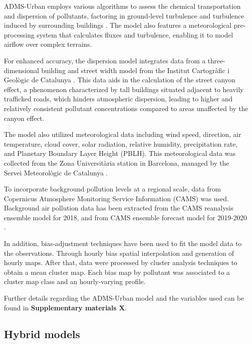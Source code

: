 \documentclass{article}
\begin{document}
ADMS-Urban employs various algorithms to assess the chemical transportation and dispersion of pollutants, factoring in ground-level turbulence and turbulence induced by surrounding buildings \cite{stocker2012adms}. The model also features a meteorological pre-processing system that calculates fluxes and turbulence, enabling it to model airflow over complex terrains.

For enhanced accuracy, the dispersion model integrates data from a three-dimensional building and street width model from the Institut Cartogràfic i Geològic de Catalunya \cite{stoter2016state, 3Dcity}. This data aids in the calculation of the street canyon effect, a phenomenon characterized by tall buildings situated adjacent to heavily trafficked roads, which hinders atmospheric dispersion, leading to higher and relatively consistent pollutant concentrations compared to areas unaffected by the canyon effect.

The model also utilized meteorological data including wind speed, direction, air temperature, cloud cover, solar radiation, relative humidity, precipitation rate, and Planetary Boundary Layer Height (PBLH). This meteorological data was collected from the Zona Universitària station in Barcelona, managed by the Servei Meteorològic de Catalunya \cite{xema2013}.

To incorporate background pollution levels at a regional scale, data from Copernicus Atmosphere Monitoring Service Information (CAMS) was used. Background air pollution data has been extracted from the CAMS reanalysis ensemble model for 2018, and from CAMS ensemble forecast model for 2019-2020 \cite{cams2020, franceinstitut}. 

In addition, bias-adjustment techniques have been used to fit the model data to the observations. Through hourly bias spatial interpolation and generation of hourly maps. After that, data were processed  by cluster analysis techniques to obtain a mean cluster map. Each bias map by pollutant was associated to a cluster map class and an hourly-varying profile. 

Further details regarding the ADMS-Urban model and the variables used can be found in \textbf{Supplementary materials X}.

\subsection{Hybrid models}
\end{document}
